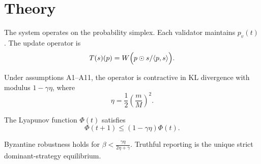 \section{Theory}

The system operates on the probability simplex. Each validator maintains \(p_v(t)\). The update operator is
\[
T(s)(p) = W \Bigl( p \odot s / \langle p, s \rangle \Bigr).
\]

Under assumptions A1–A11, the operator is contractive in KL divergence with modulus \(1 - \gamma\eta\), where
\[
\eta = \frac12 \left( \frac{m}{M} \right)^2.
\]

The Lyapunov function \(\Phi(t)\) satisfies
\[
\Phi(t+1) \le (1 - \gamma\eta) \Phi(t).
\]

Byzantine robustness holds for \(\beta < \frac{\gamma\eta}{2\eta + \gamma}\).
Truthful reporting is the unique strict dominant-strategy equilibrium.
